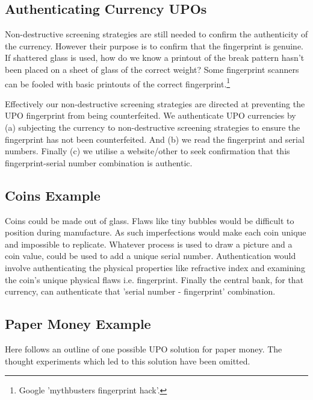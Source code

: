 \documentclass[smallextended]{svjour3}       	\smartqed  \usepackage{graphicx}
\begin{document}
\subsection{Authenticating Currency UPOs}

Non-destructive screening strategies are still needed to confirm the authenticity of the currency. However their purpose is to confirm that the fingerprint is genuine. If shattered glass is used, how do we know a printout of the break pattern hasn't been placed on a sheet of glass of the correct weight? Some fingerprint scanners can be fooled with basic printouts of the correct fingerprint.\footnote{Google 'mythbusters fingerprint hack'.}

Effectively our non-destructive screening strategies are directed at preventing the UPO fingerprint from being counterfeited. We authenticate UPO currencies by (a) subjecting the currency to non-destructive screening strategies to ensure the fingerprint has not been counterfeited. And (b) we read the fingerprint and serial numbers. Finally (c) we utilise a website/other to seek confirmation that this fingerprint-serial number combination is authentic.

\subsection{Coins Example}
Coins could be made out of glass. Flaws like tiny bubbles would be difficult to position during manufacture. As such imperfections would make each coin unique and impossible to replicate. Whatever process is used to draw a picture and a coin value, could be used to add a unique serial number. Authentication would involve authenticating the physical properties like refractive index and examining the coin's unique physical flaws i.e. fingerprint. Finally the central bank, for that currency, can authenticate that 'serial number - fingerprint' combination.

\subsection{Paper Money Example}
Here follows an outline of one possible UPO solution for paper money. The thought experiments which led to this solution have been omitted.

\vspace{1mm}
\end{document}
